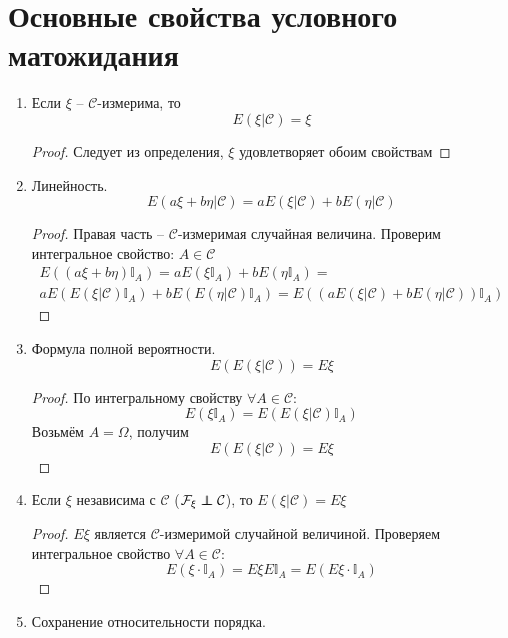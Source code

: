 \section{Основные свойства условного матожидания}
\begin{enumerate}
	\item Если $\xi$ -- $\mathcal{C}$-измерима, то
	      \[E(\xi | \mathcal{C}) = \xi\]
	      \begin{proof}
		      Следует из определения, $\xi$ удовлетворяет обоим свойствам
	      \end{proof}
	\item Линейность.
	      \[E(a\xi + b\eta | \mathcal{C}) = aE(\xi | \mathcal{C}) + bE(\eta | \mathcal{C})\]
	      \begin{proof}
		      Правая часть -- $\mathcal{C}$-измеримая случайная величина. Проверим интегральное свойство: $A \in \mathcal{C}$
		      \begin{align*}
			      E((a\xi + b\eta)\mathbb{I}_A) = aE(\xi\mathbb{I}_A) + bE(\eta\mathbb{I}_A) = \\
			      aE(E(\xi | \mathcal{C})\mathbb{I}_A) + bE(E(\eta|\mathcal{C})\mathbb{I}_A) = E((aE(\xi|\mathcal{C}) + bE(\eta|\mathcal{C}))\mathbb{I}_A)
		      \end{align*}
	      \end{proof}
	\item Формула полной вероятности.
	      \[E(E(\xi | \mathcal{C})) = E\xi\]
	      \begin{proof}
		      По интегральному свойству $\forall A \in \mathcal{C}$:
		      \[E(\xi\mathbb{I}_A) = E(E(\xi | \mathcal{C})\mathbb{I}_A)\]
		      Возьмём $A = \Omega$, получим
		      \[E(E(\xi | \mathcal{C})) = E\xi\]
	      \end{proof}
	\item Если $\xi$ независима с $\mathcal{C}$ ($\mathcal{F}_\xi \independent \mathcal{C}$), то $E(\xi | \mathcal{C}) = E\xi$
	      \begin{proof}
		      $E\xi$ является $\mathcal{C}$-измеримой случайной величиной. Проверяем интегральное свойство $\forall A \in \mathcal{C}$:
		      \[E(\xi\cdot\mathbb{I}_A) = E\xi E\mathbb{I}_A = E(E\xi \cdot \mathbb{I}_A)\]
	      \end{proof}
	\item Сохранение относительности порядка.


\end{enumerate}
